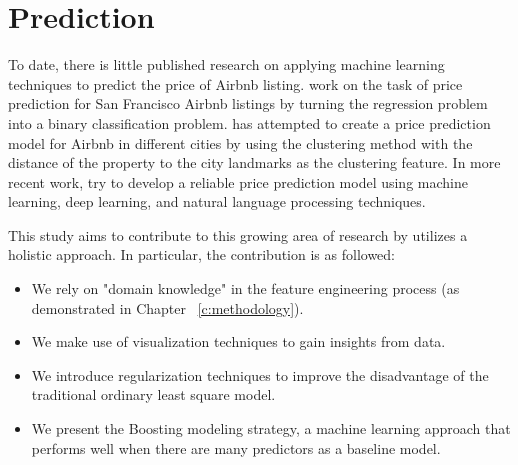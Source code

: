 \section{Prediction}

To date, there is little published research on applying machine learning
techniques to predict the price of Airbnb listing.
\textcite{tang2015neighborhood} work on the task of price prediction for San
Francisco Airbnb listings by turning the regression problem into a binary
classification problem.
\textcite{li2016reasonable} has attempted to create a price prediction model for
Airbnb in different cities by using the clustering method with the distance of
the property to the city landmarks as the clustering feature.
In more recent work, \textcite{kalehbasti2019airbnb}  try to develop a reliable
price prediction model using machine learning, deep learning, and natural
language processing techniques.


This study aims to contribute to this growing area of research by utilizes a
holistic approach. In particular, the contribution is as followed:
\begin{itemize}
  \item We rely on "domain knowledge" in the feature engineering process (as
    demonstrated in Chapter ~\ref{c:methodology}).
  \item We make use of visualization techniques to gain insights from data.
  \item We introduce regularization techniques to improve the disadvantage of the
  traditional ordinary least square model.
  \item We present the Boosting modeling strategy, a machine learning approach
    that performs well when there are many predictors as a baseline model.
\end{itemize}
